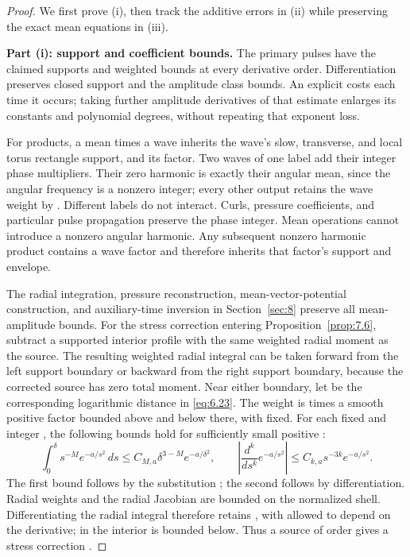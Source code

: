 \begin{proof}
We first prove (i), then track the additive errors in (ii) while preserving the exact mean equations
in (iii).

\noindent\textbf{Part (i): support and coefficient bounds.} The primary pulses have the claimed
supports and weighted bounds at every derivative order. Differentiation preserves closed support and
the amplitude class bounds. An explicit  costs
 each time it occurs; taking further amplitude derivatives of that
estimate enlarges its constants and polynomial degrees, without repeating that exponent loss.

For products, a mean times a wave inherits the wave's slow, transverse, and local torus rectangle
support, and its  factor. Two waves of one label add their integer phase
multipliers. Their zero harmonic is exactly their angular mean, since the angular frequency
 is a nonzero integer; every other output retains the wave weight by
. Different labels do not interact. Curls, pressure coefficients,
and particular pulse propagation preserve the phase integer. Mean operations cannot introduce a
nonzero angular harmonic. Any subsequent nonzero harmonic product contains a wave factor and
therefore inherits that factor's support and envelope.

The radial integration, pressure reconstruction, mean-vector-potential construction, and
auxiliary-time inversion in Section~\ref{sec:8} preserve all mean-amplitude bounds. For the stress correction
entering Proposition~\ref{prop:7.6}, subtract a supported interior profile with the same weighted
radial moment as the source. The resulting weighted radial integral can be taken forward from the
left support boundary or backward from the right support boundary, because the corrected source has
zero total moment. Near either boundary, let  be the corresponding logarithmic
distance in \eqref{eq:6.23}. The weight  is
 times a smooth positive factor bounded above and below there, with
 fixed. For each fixed  and integer
, the following bounds hold for sufficiently small positive
:
\[
\int_0^\delta s^{-M}e^{-a/s^2}\,ds
 \le C_{M,a}\delta^{3-M}e^{-a/\delta^2},
\qquad
\left|\frac{d^k}{ds^k}e^{-a/s^2}\right|
 \le C_{k,a}s^{-3k}e^{-a/s^2}.
\]
%
The first bound follows by the substitution ; the second follows by
differentiation. Radial weights and the radial Jacobian are bounded on the normalized shell.
Differentiating the radial integral therefore retains
, with  allowed to depend on the
derivative; in the interior  is bounded below. Thus a source of order
 gives a stress correction
.


\end{proof}
